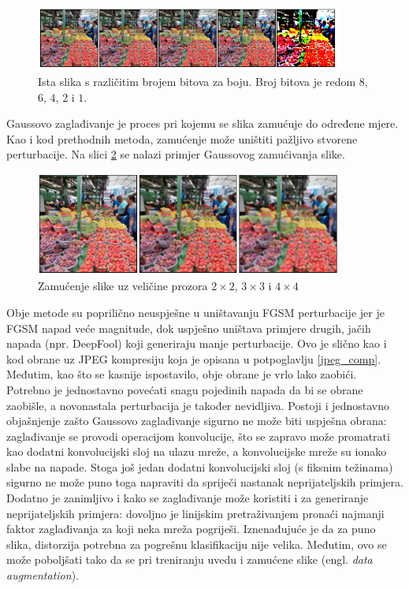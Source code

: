 \documentclass[utf8, diplomski]{fer}
\begin{document}
\begin{figure}[H]
\centering
\includegraphics[width=0.9\textwidth,keepaspectratio]{img/other/squeeze_86421.png}
\caption{Ista slika s različitim brojem bitova za boju. Broj bitova je redom $8$, $6$, $4$, $2$ i $1$.}
\label{fig:squeeze_bits}
\end{figure}

Gaussovo zaglađivanje je proces pri kojemu se slika zamućuje do određene mjere. Kao i kod prethodnih metoda, zamućenje može uništiti pažljivo stvorene perturbacije. Na slici \ref{fig:blur_example} se nalazi primjer Gaussovog zamućivanja slike. 

\begin{figure}[H]
\centering
\includegraphics[width=0.9\textwidth,keepaspectratio]{img/other/blur_example.png}
\caption{Zamućenje slike uz veličine prozora $2\times2$, $3\times3$ i $4\times4$}
\label{fig:blur_example}
\end{figure}

\par 

Obje metode su poprilično neuspješne u uništavanju FGSM perturbacije jer je FGSM napad veće magnitude, dok uspješno uništava primjere drugih, jačih napada (npr. DeepFool) koji generiraju manje perturbacije. Ovo je slično kao i kod obrane uz JPEG kompresiju koja je opisana u potpoglavlju \ref{jpeg_comp}. Međutim, kao što se kasnije ispostavilo\citep{bypass_squeezing}, obje obrane je vrlo lako zaobići. Potrebno je jednostavno povećati snagu pojedinih napada da bi se obrane zaobišle, a novonastala perturbacija je također nevidljiva. Postoji i jednostavno objašnjenje zašto Gaussovo zaglađivanje sigurno ne može biti uspješna obrana: zaglađivanje se provodi operacijom konvolucije, što se zapravo može promatrati kao dodatni konvolucijski sloj na ulazu mreže, a konvolucijske mreže su ionako slabe na napade. Stoga još jedan dodatni konvolucijski sloj (s fiksnim težinama) sigurno ne može puno toga napraviti da spriječi nastanak neprijateljskih primjera. Dodatno je zanimljivo i kako se zaglađivanje može koristiti i za generiranje neprijateljskih primjera: dovoljno je linijskim pretraživanjem pronaći najmanji faktor zaglađivanja za koji neka mreža pogriješi. Iznenađujuće je da za puno slika, distorzija potrebna za pogrešnu klasifikaciju nije velika. Međutim, ovo se može poboljšati tako da se pri treniranju uvedu i zamućene slike (engl. \textit{data augmentation}).
\end{document}
